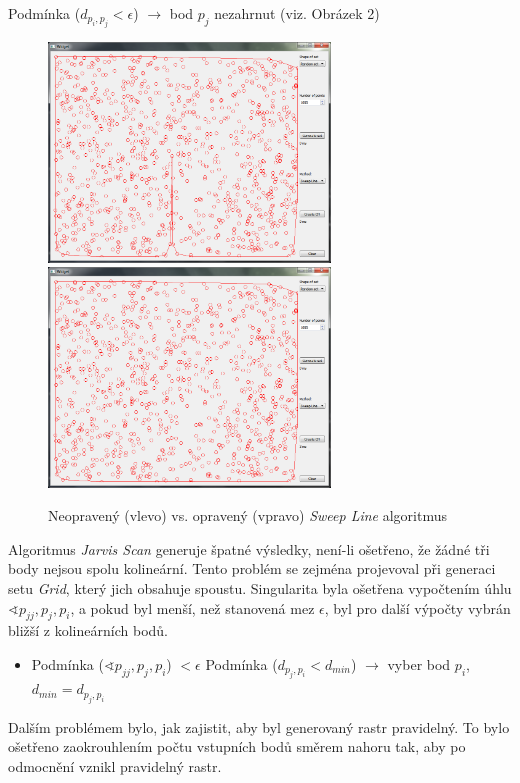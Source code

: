 \documentclass[a4paper, 12pt]{article}
\begin{document}
Podmínka ($d_{p_i,p_j} < \epsilon$) $\rightarrow$ bod $p_j$ nezahrnut (viz. Obrázek 2)\\

\begin{figure} [h!]
    \centering
      \includegraphics[width=7.5cm]{./pictures/app_sweep_wrong.png}
      \includegraphics[width=7.5cm]{./pictures/app_sweep_right.png}
      \caption{Neopravený (vlevo) vs. opravený (vpravo) \textit{Sweep Line} algoritmus}
\end{figure}

Algoritmus \textit{Jarvis Scan} generuje špatné výsledky, není-li ošetřeno, že žádné tři body nejsou spolu kolineární. Tento problém se zejména projevoval při generaci setu \textit{Grid}, který jich obsahuje spoustu. Singularita byla ošetřena vypočtením úhlu $\sphericalangle p_{jj}, p_j, p_i$, a pokud byl menší, než stanovená mez $\epsilon$, byl pro další výpočty vybrán bližší z kolineárních bodů.

\begin{itemize}
\item Podmínka ($\sphericalangle p_{jj}, p_j, p_i$) $< \epsilon$
\subitem Podmínka ($d_{p_j,p_i} < d_{min}$) $\rightarrow$ vyber bod $p_i$, $d_{min} = d_{p_j,p_i}$
\end{itemize}

Dalším problémem bylo, jak zajistit, aby byl generovaný rastr pravidelný. To bylo ošetřeno zaokrouhlením počtu vstupních bodů směrem nahoru tak, aby po odmocnění vznikl pravidelný rastr.\\
\end{document}
